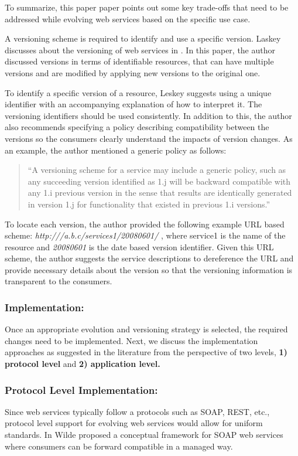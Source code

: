 \documentclass[runningheads,a4paper]{llncs}
\begin{document}
To summarize, this paper paper points out some key trade-offs that need to be addressed while evolving web services based on the specific use case.

A versioning scheme is required to identify and use a specific version. Laskey discusses about the versioning of web services in \cite{laskey2008considerations}. In this paper, the author discussed versions in terms of identifiable resources, that can have multiple versions and are modified by applying new versions to the original one.

To identify a specific version of a resource, Leskey suggests using a unique identifier with an accompanying explanation of how to interpret it. The versioning identifiers should be used consistently. In addition to this, the author also recommends specifying a policy describing compatibility between the versions so the consumers clearly understand the impacts of version changes. As an example, the author mentioned a generic policy as follows:

\begin{quote}
``A versioning scheme for a service may include a generic policy, such as any succeeding version identified as 1.j will be backward compatible with any 1.i previous version in the sense that results are identically generated in version 1.j for functionality that existed in previous 1.i versions.''
\end{quote}

To locate each version, the author provided the following example URL based scheme: \emph{http:///a.b.c/services1/20080601/} , where service1 is the name of the resource and \emph{20080601} is the date based version identifier. Given this URL scheme, the author suggests the service descriptions to dereference the URL and provide necessary details about the version so that the versioning information is transparent to the consumers.

\subsubsection{Implementation:}
Once an appropriate evolution and versioning strategy is selected, the required changes need to be implemented. Next, we discuss the implementation approaches as suggested in the literature from the perspective of two levels, \textbf{1) protocol level} and \textbf{2) application level.}

\subsubsection{Protocol Level Implementation:}
Since web services typically follow a protocols such as SOAP, REST, etc., protocol level support for evolving web services would allow for uniform standards. In \cite{wilde2004semantically} Wilde proposed a conceptual framework for SOAP web services where consumers can be forward compatible in a managed way.
\end{document}
